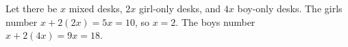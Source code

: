 Let there be $x$ mixed desks, $2x$ girl-only desks, and $4x$ boy-only desks. The girls number $x+2(2x)=5x=10$, so $x=2$. The boys number $x+2(4x)=9x=\boxed{18}$.
